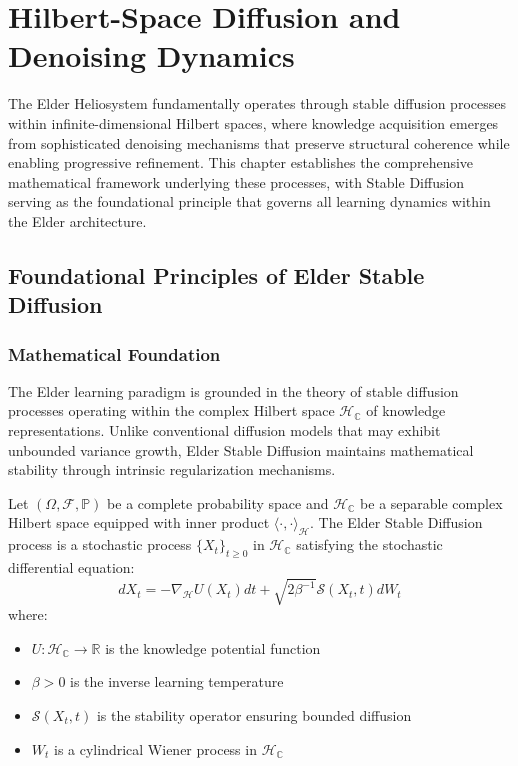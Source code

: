 \chapter{Hilbert-Space Diffusion and Denoising Dynamics}
\label{ch:hilbert_diffusion}

The Elder Heliosystem fundamentally operates through stable diffusion processes within infinite-dimensional Hilbert spaces, where knowledge acquisition emerges from sophisticated denoising mechanisms that preserve structural coherence while enabling progressive refinement. This chapter establishes the comprehensive mathematical framework underlying these processes, with Stable Diffusion serving as the foundational principle that governs all learning dynamics within the Elder architecture.

\section{Foundational Principles of Elder Stable Diffusion}

\subsection{Mathematical Foundation}

The Elder learning paradigm is grounded in the theory of stable diffusion processes operating within the complex Hilbert space $\mathcal{H}_{\mathbb{C}}$ of knowledge representations. Unlike conventional diffusion models that may exhibit unbounded variance growth, Elder Stable Diffusion maintains mathematical stability through intrinsic regularization mechanisms.

\begin{definition}
Let $(\Omega, \mathcal{F}, \mathbb{P})$ be a complete probability space and $\mathcal{H}_{\mathbb{C}}$ be a separable complex Hilbert space equipped with inner product $\langle \cdot, \cdot \rangle_{\mathcal{H}}$. The Elder Stable Diffusion process is a stochastic process $\{X_t\}_{t \geq 0}$ in $\mathcal{H}_{\mathbb{C}}$ satisfying the stochastic differential equation:
\begin{equation}
dX_t = -\nabla_{\mathcal{H}} U(X_t) dt + \sqrt{2\beta^{-1}} \mathcal{S}(X_t, t) dW_t
\end{equation}
where:
\begin{itemize}
\item $U: \mathcal{H}_{\mathbb{C}} \to \mathbb{R}$ is the knowledge potential function
\item $\beta > 0$ is the inverse learning temperature
\item $\mathcal{S}(X_t, t)$ is the stability operator ensuring bounded diffusion
\item $W_t$ is a cylindrical Wiener process in $\mathcal{H}_{\mathbb{C}}$
\end{itemize}
\end{definition}

